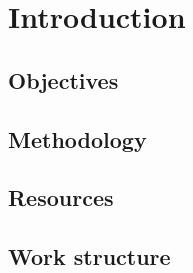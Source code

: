 \chapter{Introduction}

\section{Objectives}

\section{Methodology}

\section{Resources}

\section{Work structure}
